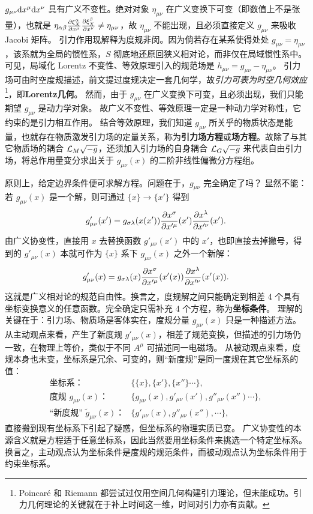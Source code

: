 $g_{\mu\nu}\dd x^\mu \dd x^\nu$ 具有广义不变性。绝对对象 $\eta_{\mu\nu}$ 在广义变换下可变（即数值上不是张量），也就是 $\eta_{\alpha\beta}\pdv{\xi_X^\alpha}{x^\mu}\pdv{\xi_X^\beta}{x^\nu}\ne\eta_{\mu\nu}$，故 $\eta_{\mu\nu}$ 不能出现，且必须直接定义 $g_{\mu\nu}$ 来吸收 Jacobi 矩阵。
引力作用现解释为度规非闵。因为倘若存在某系使得处处 $g_{\mu\nu}=\eta_{\mu\nu}$，该系就为全局的惯性系，$S$ 彻底地还原回狭义相对论，而非仅在局域惯性系中。
可见，局域化 Lorentz 不变性、等效原理引入的规范场是 $h_{\mu\nu}=g_{\mu\nu}-\eta_{\mu\nu}$。
引力场可由时空度规描述，前文提过度规决定一套几何学，故\textit{引力可表为时空几何效应}\footnote{Poincaré 和 Riemann 都尝试过仅用空间几何构建引力理论，但未能成功。引力几何理论的关键就在于补上时间这一维，时间对引力亦有贡献。}，即\textbf{Lorentz几何}。
然而，由于 $g_{\mu\nu}$ 在广义变换下可变，且必须出现，我们只能期望 $g_{\mu\nu}$ 是动力学对象。
故广义不变性、等效原理一定是一种动力学对称性，它约束的是引力相互作用。
结合等效原理，我们知道 $g_{\mu\nu}$ 所关乎的物质状态是能量，也就存在物质激发引力场的定量关系，称为\textbf{引力场方程}或\textbf{场方程}。故除了与其它物质场的耦合 $\mathcal{L}_M\sqrt{-g}$，还须加入引力场的自身耦合 $\mathcal{L}_G\sqrt{-g}$ 来代表自由引力场，将总作用量变分求出关于 $g_{\mu\nu}(x)$ 的二阶非线性偏微分方程组。

原则上，给定边界条件便可求解方程。问题在于，$g_{\mu\nu}$ 完全确定了吗？
显然不能：若 $g_{\mu\nu}(x)$ 是一个解，则可通过 $\{x\}\to \{x'\}$ 得到
\[g'_{\mu\nu}(x')=g_{\sigma\lambda}(x(x')){\pdv{x^\sigma}{x'^\mu}}(x'){\pdv{x^\lambda}{x'^\nu}}(x').\]
由广义协变性，直接用 $x$ 去替换函数 $g'_{\mu\nu}(x')$ 中的 $x'$，也即直接去掉撇号，得到的 $g'_{\mu\nu}(x)$ 本就可作为 $\{x\}$ 系下 $g_{\mu\nu}(x)$ 之外一个新解：
\[g'_{\mu\nu}(x)=g_{\sigma\lambda}(x){\pdv{x^\sigma}{x'^\mu}}(x'(x)){\pdv{x^\lambda}{x'^\nu}}(x'(x)).\]
这就是广义相对论的规范自由性。换言之，度规解之间只能确定到相差 4 个具有坐标变换意义的任意函数。完全确定只需补充 4 个方程，称为\textbf{坐标条件}。
理解的关键在于：引力场、物质场是客体实在，度规分量 $g_{\mu\nu}(x)$ 只是一种描述方法。
从主动观点来看，产生了新度规 $g'_{\mu\nu}(x)$，相差了规范变换，但描述的引力场仍一致，在物理上等价，类似于不同 $A^\mu$ 可描述同一电磁场。
从被动观点来看，度规本身也未变，坐标系是冗余、可变的，则“新度规”是同一度规在其它坐标系的值：
\begin{align*}
    \text{坐标系：}&\{\{x\},\{x'\},\{x''\}\cdots\},\\
    \text{度规 $g_{\mu\nu}(x)$：}&\{g_{\mu\nu}(x),g'_{\mu\nu}(x'),g''_{\mu\nu}(x'')\cdots\},\\
    \text{“新度规” $\tilde g_{\mu\nu}(x)$：}&\{g'_{\mu\nu}(x),g''_{\mu\nu}(x''),\cdots\},
\end{align*}
直接搬到现有坐标系下引起了疑惑，但坐标系的物理实质已变。
广义协变性的本源含义就是方程适于任意坐标系，因此当然要用坐标条件来挑选一个特定坐标系。
换言之，主动观点认为坐标条件是度规的规范条件，而被动观点认为坐标条件用于约束坐标系。

